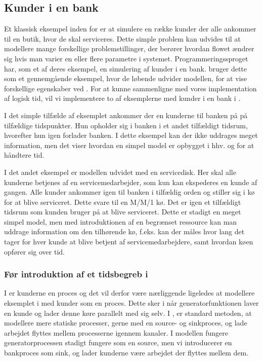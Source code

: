

\subsection{Kunder i en bank}\label{bank-eksempel}
Et klassisk eksempel inden for \des er at simulere  
en række kunder der alle ankommer til en butik, hvor de skal serviceres. Dette 
simple problem kan udvides til at modellere mange forskellige 
problemstillinger, der berører hvordan flowet ændrer sig hvis man varier en eller flere parametre
i systemet. Programmeringssproget \simpy{}har, som et af deres eksempel, en 
simulering af kunder i en bank. \simpy bruger dette som et gennemgående 
eksempel, hvor de løbende udvider modellen, for at vise forskellige 
egenskaber ved \simpy. For at kunne sammenligne \simpy  med vores 
implementation af logisk tid, vil vi implementere to af eksemplerne med kunder i en bank i \pycsp.

I det simple tilfælde af eksemplet ankommer der en kunderne til banken på på 
tilfældige tidspunkter. Hun opholder sig i banken i et andet tilfældigt tidsrum, hvorefter hun 
igen forlader banken. I dette eksempel kan der ikke uddrages meget information, men det viser hvordan en simpel model er opbygget i hhv. \simpy og \pycsp for at håndtere tid.

I det andet eksempel er modellen udvidet med en servicedisk. Her skal alle kunderne betjenes af en 
servicemedarbejder, som kun kan ekspederes en kunde af gangen. Alle kunder ankommer igen til banken i tilfældig orden og 
stiller sig i kø for at blive serviceret. Dette  svare til en M/M/1 kø. Det er igen et tilfældigt tidsrum som kunden bruger på at blive serviceret.  Dette er stadigt en meget simpel model, men med introduktionen af en begrænset ressource kan man uddrage information om den tilhørende kø, f.eks. kan der måles hvor lang det tager for hver kunde at  blive betjent af servicemedarbejdere, samt hvordan køen opfører sig over tid. 

\subsubsection{Før introduktion af et tidsbegreb i \pycsp}
I \simpy er kunderne en proces og det vil derfor være nærliggende ligeledes at 
modellere eksemplet i \pycsp med kunder som en proces. Dette sker i  \simpy når
generatorfunktionen laver en kunde og lader  denne køre parallelt med sig selv. 
I \pycsp, er standard metoden, at modellere mere statiske processer, gerne med en source- og sinkproces, og lade arbejdet flyttes mellem processerne igennem kanaler. I \pycsp modellen fungere generatorprocessen stadigt fungere som en source, men vi introducerer en 
bankproces som sink, og lader kunderne være arbejdet der flyttes mellem dem. 

